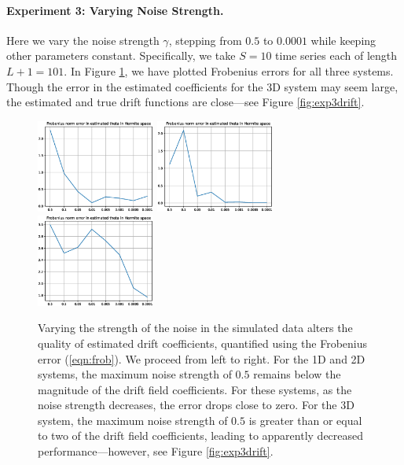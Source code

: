 \documentclass{article}
\begin{document}
\paragraph{Experiment 3: Varying Noise Strength.} Here we vary the noise strength $\gamma$, stepping from $0.5$ to $0.0001$ while keeping other parameters constant.  Specifically, we take $S=10$ time series each of length $L+1 = 101$.  In Figure \ref{fig:exp3hermite}, we have plotted Frobenius errors for all three systems.  Though the error in the estimated coefficients for the 3D system may seem large, the estimated and true drift functions are close---see Figure \ref{fig:exp3drift}.

\begin{figure}[th]
\begin{center}
\includegraphics[height=1.2in]{../1dcode/varying_noise/plots/hermite.eps}
\includegraphics[height=1.2in]{../2dcode/varying_noise/plots/hermite.eps}
\includegraphics[height=1.2in]{../3ddampedduffing/varying_noise/plots/hermite.eps}
\end{center}
\caption{Varying the strength of the noise in the simulated data alters the quality of estimated drift coefficients, quantified using the Frobenius error (\ref{eqn:frob}).  We proceed from left to right.  For the 1D and 2D systems, the maximum noise strength of $0.5$ remains below the magnitude of the drift field coefficients. For these systems, as the noise strength decreases, the error drops close to zero.  For the 3D system, the maximum noise strength of $0.5$ is greater than or equal to two of the drift field coefficients, leading to apparently decreased performance---however, see Figure \ref{fig:exp3drift}.}
\label{fig:exp3hermite}
\end{figure}
\end{document}

